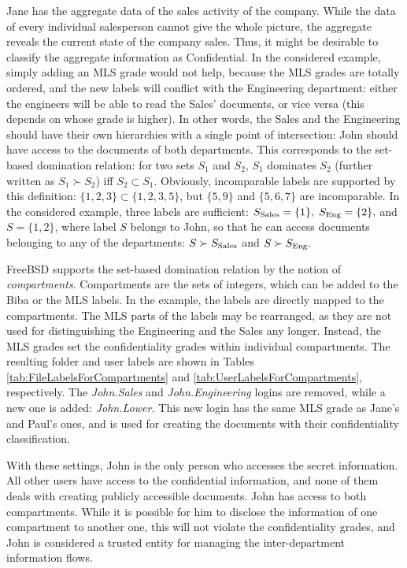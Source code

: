 \documentclass[10pt,a4paper,conference,onecolumn]{IEEEtran}
\newcommand{\KBERcode}[1]{\textsl{#1}}
\begin{document}
Jane has the aggregate data of the sales activity of the company. While
the data of every individual salesperson cannot give the whole picture,
the aggregate reveals the current state of the company sales. Thus, it
might be desirable to classify the aggregate information as Confidential.
In the considered example, simply adding an MLS grade
would not help, because the MLS grades are totally ordered, and
the new labels will conflict with the Engineering department: either the
engineers will be able to read the Sales' documents, or vice versa (this
depends on whose grade is higher). In other words, the Sales
and the Engineering should have their own hierarchies with a single
point of intersection: John should have access to the documents
of both departments. This corresponds to the set-based domination
relation: for two sets $S_1$ and $S_2$, $S_1$ dominates $S_2$ (further
written as $S_1\succ S_2$) iff $S_2\subset S_1$. Obviously, incomparable
labels are supported by this definition: $\{1,2,3\}\subset\{1,2,3,5\}$,
but $\{5,9\}$ and $\{5,6,7\}$ are incomparable.
In the considered example, three labels are sufficient: 
$S_{\mbox{\scriptsize{Sales}}}=\{1\},\;S_{\mbox{\scriptsize{Eng}}}=\{2\},$ 
and $S=\{1,2\}$, where label $S$ belongs to John, so that he can access documents
belonging to any of the departments: $S\succ S_{\mbox{\scriptsize{Sales}}}$ and 
$S\succ S_{\mbox{\scriptsize{Eng}}}.$

FreeBSD supports the set-based domination relation by the notion of
\emph{compartments}. Compartments are the sets of integers, which
can be added to the Biba or the MLS labels. In the example, the labels
are directly mapped to the compartments. The MLS parts of the labels
may be rearranged, as they are not used for distinguishing
the Engineering and the Sales any longer. Instead, the MLS grades
set the confidentiality grades within individual compartments. The
resulting folder and user labels are shown in Tables
\ref{tab:FileLabelsForCompartments} and \ref{tab:UserLabelsForCompartments},
respectively. The \KBERcode{John.Sales} and \KBERcode{John.Engineering}
logins are removed, while a new one is added: \KBERcode{John.Lower.}
This new login has the same MLS grade as Jane's and Paul's ones, and is used
for creating the documents with their confidentiality classification.

With these settings, John is the only person who accesses the secret 
information. All other users have access to the confidential information,
and none of them deals with creating publicly accessible documents. John
has access to both compartments. While it is possible for him to disclose
the information of one compartment to another one, this will not
violate the confidentiality grades, and John is considered a trusted entity
for managing the inter-department information flows.
\end{document}
